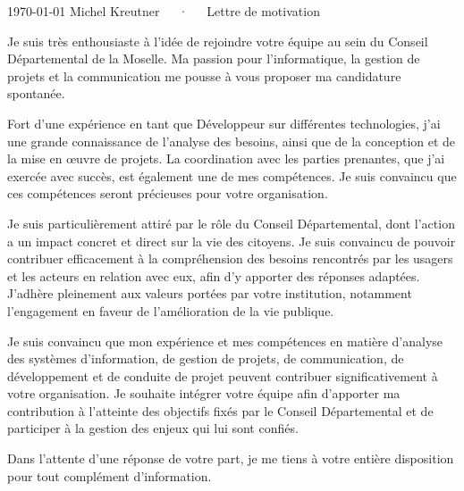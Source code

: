 \documentclass[11pt, a4paper]{awesome-cv}
\begin{document}
\makecvheader[R]

\makecvfooter
  {\today}
  {Michel Kreutner~~~·~~~Lettre de motivation}
  {}

\makelettertitle

\begin{cvletter}

Je suis très enthousiaste à l'idée de rejoindre votre équipe au sein
du Conseil Départemental de la Moselle. Ma passion pour l'informatique,
la gestion de projets et la communication me pousse à vous proposer ma
candidature spontanée.

Fort d'une expérience en tant que Développeur sur différentes technologies,
j'ai une grande connaissance de l'analyse des besoins, ainsi que de la
conception et de la mise en œuvre de projets. La coordination avec les
parties prenantes, que j'ai exercée avec succès, est également une de
mes compétences. Je suis convaincu que ces compétences seront précieuses
pour votre organisation.

Je suis particulièrement attiré par le rôle du Conseil Départemental, dont 
l'action a un impact concret et direct sur la vie des citoyens. Je suis 
convaincu de pouvoir contribuer efficacement à la compréhension des besoins 
rencontrés par les usagers et les acteurs en relation avec eux, afin d'y 
apporter des réponses adaptées. J'adhère pleinement aux valeurs portées par 
votre institution, notamment l'engagement en faveur de l'amélioration de 
la vie publique.

Je suis convaincu que mon expérience et mes compétences en matière d'analyse
des systèmes d'information, de gestion de projets, de communication, de
développement et de conduite de projet peuvent contribuer significativement
à votre organisation. Je souhaite intégrer votre équipe afin d'apporter ma 
contribution à l'atteinte des objectifs fixés par le Conseil Départemental 
et de participer à la gestion des enjeux qui lui sont confiés.

Dans l'attente d'une réponse de votre part, je me tiens à votre entière
disposition pour tout complément d'information.

\end{cvletter}


\makeletterclosing
\end{document}

